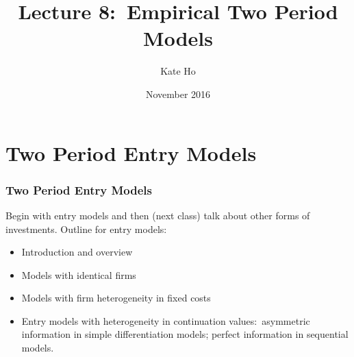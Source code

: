 
\def\beamerclassoptions{[notes=show]}


\newenvironment{stepenumerate}{\begin{enumerate}[<+->]}{\end{enumerate}}
\newenvironment{stepitemize}{\begin{itemize}[<+->]}{\end{itemize} }
\newenvironment{stepenumeratewithalert}{\begin{enumerate}[<+-| alert@+>]}{\end{enumerate}}
\newenvironment{stepitemizewithalert}{\begin{itemize}[<+-| alert@+>]}{\end{itemize} }
%


\title[Lecture 10]{Lecture 8:\ Empirical Two Period Models}
\author{Kate Ho }
\date[11/13]{ November 2016}
\maketitle

\section{Two Period Entry Models}

\begin{frame}%
\frametitle{Two Period Entry Models}

Begin with entry models and then (next class) talk about other forms of
investments. Outline for entry models:

\begin{itemize}
\item Introduction and overview

\item Models with identical firms

\item Models with firm heterogeneity in fixed costs

\item Entry models with heterogeneity in continuation values:\ asymmetric
information in simple differentiation models; perfect information in
sequential models.
\end{itemize}

\end{frame}%

